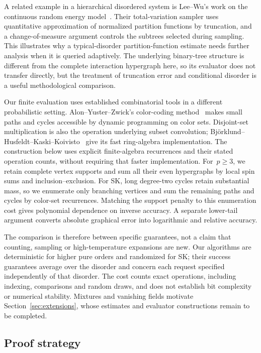 \documentclass[10pt]{article}
\theoremstyle{plain}
\theoremstyle{definition}
\theoremstyle{remark}
\begin{document}
A related example in a hierarchical disordered system is Lee--Wu's work on the continuous random energy model~\cite{LW25}. Their total-variation sampler uses quantitative approximation of normalized partition functions by truncation, and a change-of-measure argument controls the subtrees selected during sampling. This illustrates why a typical-disorder partition-function estimate needs further analysis when it is queried adaptively. The underlying binary-tree structure is different from the complete interaction hypergraph here, so its evaluator does not transfer directly, but the treatment of truncation error and conditional disorder is a useful methodological comparison.

Our finite evaluation uses established combinatorial tools in a different probabilistic setting. Alon--Yuster--Zwick's color-coding method~\cite{AYZ95} makes small paths and cycles accessible by dynamic programming on color sets. Disjoint-set multiplication is also the operation underlying subset convolution; Bj\"orklund--Husfeldt--Kaski--Koivisto~\cite{BHKK07} give its fast ring-algebra implementation. The construction below uses explicit finite-algebra recurrences and their stated operation counts, without requiring that faster implementation. For~$p\ge3$, we retain complete vertex supports and sum all their even hypergraphs by local spin sums and inclusion--exclusion. For SK, long degree-two cycles retain substantial mass, so we enumerate only branching vertices and sum the remaining paths and cycles by color-set recurrences. Matching the support penalty to this enumeration cost gives polynomial dependence on inverse accuracy. A separate lower-tail argument converts absolute graphical error into logarithmic and relative accuracy.

The comparison is therefore between specific guarantees, not a claim that counting, sampling or high-temperature expansions are new. Our algorithms are deterministic for higher pure orders and randomized for SK; their success guarantees average over the disorder and concern each request specified independently of that disorder. The cost counts exact operations, including indexing, comparisons and random draws, and does not establish bit complexity or numerical stability. Mixtures and vanishing fields motivate Section~\ref{sec:extensions}, whose estimates and evaluator constructions remain to be completed.

\subsection{Proof strategy}
\end{document}
